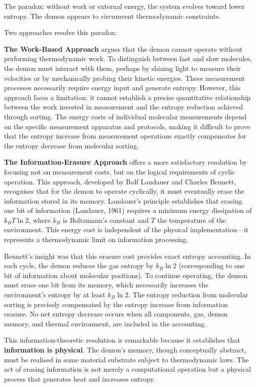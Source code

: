The paradox: without work or external energy, the system evolves toward lower entropy. The demon appears to circumvent thermodynamic constraints.

Two approaches resolve this paradox:

\textbf{The Work-Based Approach} argues that the demon cannot operate without performing thermodynamic work. To distinguish between fast and slow molecules, the demon must interact with them, perhaps by shining light to measure their velocities or by mechanically probing their kinetic energies. These measurement processes necessarily require energy input and generate entropy. However, this approach faces a limitation: it cannot establish a precise quantitative relationship between the work invested in measurement and the entropy reduction achieved through sorting. The energy costs of individual molecular measurements depend on the specific measurement apparatus and protocols, making it difficult to prove that the entropy increase from measurement operations exactly compensates for the entropy decrease from molecular sorting.

\textbf{The Information-Erasure Approach} offers a more satisfactory resolution by focusing not on measurement costs, but on the logical requirements of cyclic operation. This approach, developed by Rolf Landauer and Charles Bennett, recognises that for the demon to operate cyclically, it must eventually erase the information stored in its memory. Landauer's principle establishes that erasing one bit of information (Landauer, 1961) requires a minimum energy dissipation of $k_B T \ln 2$, where $k_B$ is Boltzmann's constant and $T$ the temperature of the environment. This energy cost is independent of the physical implementation—it represents a thermodynamic limit on information processing.

Bennett's insight was that this erasure cost provides exact entropy accounting. In each cycle, the demon reduces the gas entropy by $k_B \ln 2$ (corresponding to one bit of information about molecular positions). To continue operating, the demon must erase one bit from its memory, which necessarily increases the environment's entropy by at least $k_B \ln 2$. The entropy reduction from molecular sorting is precisely compensated by the entropy increase from information erasure. No net entropy decrease occurs when all components, gas, demon memory, and thermal environment, are included in the accounting.

This information-theoretic resolution is remarkable because it establishes that \textbf{information is physical}. The demon's memory, though conceptually abstract, must be realised in some material substrate subject to thermodynamic laws. The act of erasing information is not merely a computational operation but a physical process that generates heat and increases entropy.

